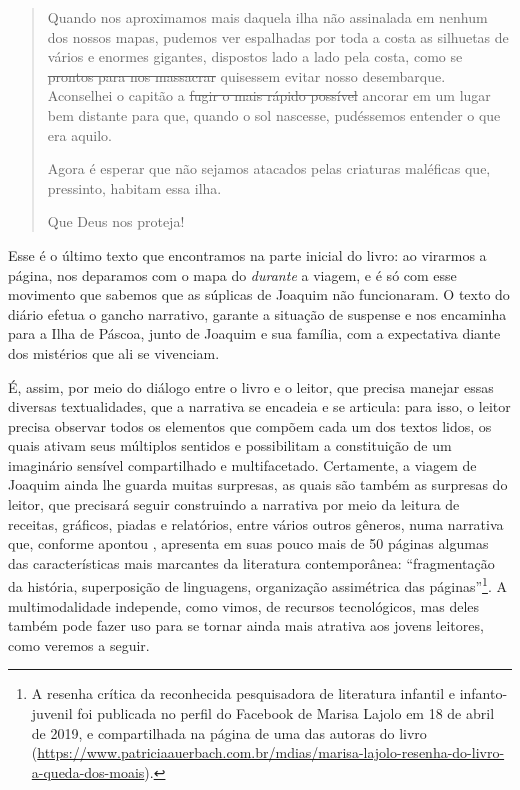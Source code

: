 \documentclass[portuguese]{textolivre}
\begin{document}
\begin{quote}
Quando nos aproximamos mais daquela ilha não assinalada em nenhum dos
nossos mapas, pudemos ver espalhadas por toda a costa as silhuetas de
vários e enormes gigantes, dispostos lado a lado pela costa, como se
\st{prontos para nos massacrar} quisessem evitar nosso desembarque.
Aconselhei o capitão a \st{fugir o mais rápido possível} ancorar em um
lugar bem distante para que, quando o sol nascesse, pudéssemos entender o
que era aquilo.
    
Agora é esperar que não sejamos atacados pelas criaturas maléficas que,
pressinto, habitam essa ilha.

Que Deus nos proteja! \cite[p.~15, tachados do original]{franco_queda_2018}
\end{quote}



Esse é o último texto que encontramos na parte inicial do livro: ao virarmos a
página, nos deparamos com o mapa do \textit{durante} a viagem, e é só com esse
movimento que sabemos que as súplicas de Joaquim não funcionaram. O texto do
diário efetua o gancho narrativo, garante a situação de suspense e nos
encaminha para a Ilha de Páscoa, junto de Joaquim e sua família, com a
expectativa diante dos mistérios que ali se vivenciam. 

É, assim, por meio do diálogo entre o livro e o leitor, que precisa manejar
essas diversas textualidades, que a narrativa se encadeia e se articula: para
isso, o leitor precisa observar todos os elementos que compõem cada um dos
textos lidos, os quais ativam seus múltiplos sentidos e possibilitam a
constituição de um imaginário sensível compartilhado e multifacetado.
Certamente, a viagem de Joaquim ainda lhe guarda muitas surpresas, as quais são
também as surpresas do leitor, que precisará seguir construindo a narrativa por
meio da leitura de receitas, gráficos, piadas e relatórios, entre vários outros
gêneros, numa narrativa que, conforme apontou \textcite{lajolo_resenha_2019},
apresenta em suas pouco mais de 50 páginas algumas das características mais
marcantes da literatura contemporânea: “fragmentação da história, superposição
de linguagens, organização assimétrica das páginas”\footnote{A resenha crítica
da reconhecida pesquisadora de literatura infantil e infanto-juvenil foi
publicada no perfil do Facebook de Marisa Lajolo em 18 de abril de 2019, e
compartilhada na página de uma das autoras do livro
(\url{https://www.patriciaauerbach.com.br/mdias/marisa-lajolo-resenha-do-livro-a-queda-dos-moais}).}.
A multimodalidade independe, como vimos, de recursos tecnológicos, mas deles
também pode fazer uso para se tornar ainda mais atrativa aos jovens leitores,
como veremos a seguir.
\end{document}

